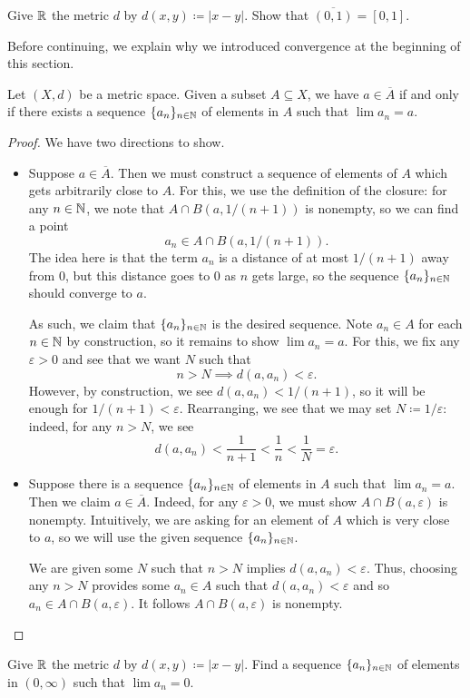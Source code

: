 \documentclass[../main.tex]{subfiles}
\begin{document}
\begin{exe} \label{exe:cl-of-open-interval}
    Give $\mathbb R$ the metric $d$ by $d(x,y)\coloneqq|x-y|$. Show that $\overline{(0,1)}=[0,1]$.
\end{exe}
Before continuing, we explain why we introduced convergence at the beginning of this section.
\begin{proposition} \label{prop:cl-by-sequences}
    Let $(X,d)$ be a metric space. Given a subset $A\subseteq X$, we have $a\in\overline A$ if and only if there exists a sequence $\{a_n\}_{n\in\mathbb N}$ of elements in $A$ such that $\lim a_n=a$.
\end{proposition}
\begin{proof}
    We have two directions to show.
    \begin{itemize}
        \item Suppose $a\in\overline A$. Then we must construct a sequence of elements of $A$ which gets arbitrarily close to $A$. For this, we use the definition of the closure: for any $n\in\mathbb N$, we note that $A\cap B(a,1/(n+1))$ is nonempty, so we can find a point
        \[a_n\in A\cap B(a,1/(n+1)).\]
        The idea here is that the term $a_n$ is a distance of at most $1/(n+1)$ away from $0$, but this distance goes to $0$ as $n$ gets large, so the sequence $\{a_n\}_{n\in\mathbb N}$ should converge to $a$.
        
        As such, we claim that $\{a_n\}_{n\in\mathbb N}$ is the desired sequence. Note $a_n\in A$ for each $n\in\mathbb N$ by construction, so it remains to show $\lim a_n=a$. For this, we fix any $\varepsilon>0$ and see that we want $N$ such that
        \[n>N\implies d(a,a_n)<\varepsilon.\]
        However, by construction, we see $d(a,a_n)<1/(n+1)$, so it will be enough for $1/(n+1)<\varepsilon$. Rearranging, we see that we may set $N\coloneqq1/\varepsilon$: indeed, for any $n>N$, we see
        \[d(a,a_n)<\frac1{n+1}<\frac1n<\frac1N=\varepsilon.\]

        \item Suppose there is a sequence $\{a_n\}_{n\in\mathbb N}$ of elements in $A$ such that $\lim a_n=a$. Then we claim $a\in\overline A$. Indeed, for any $\varepsilon>0$, we must show $A\cap B(a,\varepsilon)$ is nonempty. Intuitively, we are asking for an element of $A$ which is very close to $a$, so we will use the given sequence $\{a_n\}_{n\in\mathbb N}$.

        We are given some $N$ such that $n>N$ implies $d(a,a_n)<\varepsilon$. Thus, choosing any $n>N$ provides some $a_n\in A$ such that $d(a,a_n)<\varepsilon$ and so $a_n\in A\cap B(a,\varepsilon)$. It follows $A\cap B(a,\varepsilon)$ is nonempty.
        \qedhere
    \end{itemize}
\end{proof}
\begin{exe}
    Give $\mathbb R$ the metric $d$ by $d(x,y)\coloneqq|x-y|$. Find a sequence $\{a_n\}_{n\in\mathbb N}$ of elements in $(0,\infty)$ such that $\lim a_n=0$.
\end{exe}
\end{document}
